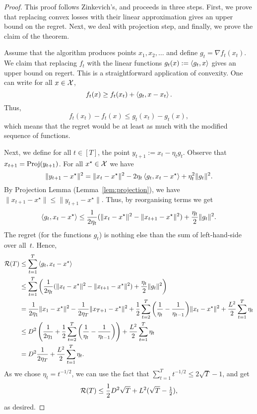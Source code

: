 \begin{proof}
    This proof follows Zinkevich's, and proceeds in three steps. First, we prove that replacing convex losses with their linear approximation gives an upper bound on the regret. Next, we deal with projection step, and finally, we prove the claim of the theorem.

    Assume that the algorithm produces points $x_1, x_2,\ldots$ and define $g_t = \nabla f_t(x_t)$. We claim that replacing $f_t$ with the linear functions $g_t(x) := \left\langle g_t,x \right\rangle$ gives an upper bound on regert. This is a straightforward application of convexity. One can write for all $x\in\mathcal{X}$,
    \[
        f_t(x) \geq f_t(x_t) + \left\langle g_t,x- x_t \right\rangle.
    \]
Thus,
\[
    f_t(x_t) - f_t(x) \leq g_t(x_t) - g_t(x),
\]
which means that the regret would be at least as much with the modified sequence of functions. 

Next, we define for all $t\in[T]$, the point $y_{t+1} := x_t - \eta_t g_t$. Observe that $x_{t+1} = \operatorname{Proj}(y_{t+1})$. For all $x^\star \in \mathcal{X}$ we have
\[
    \|y_{t+1} - x^\star\|^2 = \|x_t - x^\star\|^2 - 2\eta_t \left\langle g_t,x_t - x^\star \right\rangle + \eta_t^2 \|g_t\|^2.
\]
By Projection Lemma (Lemma~\ref{lem:projection}), we have $\|x_{t+1} - x^\star\| \leq \|y_{t+1} - x^\star\|$. Thus, by reorganising terms we get
\[
    \left\langle g_t,x_t - x^\star \right\rangle \leq \frac{1}{2\eta_t}(\|x_t - x^\star\|^2 - \|x_{t+1} - x^\star\|^2) + \frac{\eta_t}{2} \|g_t\|^2.
\]
The regret (for the functions $g_t$) is nothing else than the sum of left-hand-side over all~$t$. Hence, 
\begin{align*}
    \mathcal{R}(T) &\leq \sum_{t=1}^T \left\langle g_t,x_t - x^\star \right\rangle \\
         &\leq \sum_{t=1}^T \bigg(\frac{1}{2\eta_t}(\|x_t - x^\star\|^2 - \|x_{t+1} - x^\star\|^2) + \frac{\eta_t}{2} \|g_t\|^2\bigg) \\
         &= \frac{1}{2\eta_1}\|x_1 - x^\star\|^2 - \frac{1}{2\eta_T}\|x_{T+1} - x^\star\|^2 + \frac{1}{2}\sum_{t=2}^T \bigg(\frac{1}{\eta_t} - \frac{1}{\eta_{t-1}}\bigg)\|x_t - x^\star\|^2 + \frac{L^2}{2} \sum_{t=1}^T \eta_t \\
         &\leq D^2\left(\frac{1}{2\eta_1} +  \frac{1}{2}\sum_{t=2}^T \left(\frac{1}{\eta_t} - \frac{1}{\eta_{t-1}}\right)  \right) + \frac{L^2}{2} \sum_{t=1}^T \eta_t \\
         &=D^2\frac{1}{2\eta_T} + \frac{L^2}{2} \sum_{t=1}^T \eta_t.
\end{align*}
As we chose $\eta_t = t^{-1/2}$, we can use the fact that $\sum_{t=1}^T t^{-1/2} \leq 2\sqrt{T} - 1$, and get
\[
    \mathcal{R}(T) \leq \frac{1}{2}D^2\sqrt{T} + L^2(\sqrt{T} - \tfrac{1}{2}),
\]
as desired.
\end{proof}

